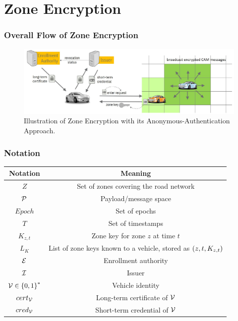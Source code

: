 \documentclass{beamer}
\begin{document}
    \section{Zone Encryption}
    \begin{frame}
        \frametitle{Overall Flow of Zone Encryption}
        \begin{figure}[!ht]
            \centering
            \includegraphics[width=\textwidth]{figs/ze_flow.png}
            \caption{Illustration of Zone Encryption with its Anonymous-Authentication Approach.}
        \end{figure}
    \end{frame}

    \begin{frame}
        \frametitle{Notation}
        \begin{table}[!ht]
            \centering
            \begin{tabular}{|c|c|}
                \hline
                \textbf{Notation} & \textbf{Meaning} \\
                \hline
                \(Z\) & Set of zones covering the road network \\
                \hline
                \(\mathcal P\) & Payload/message space \\
                \hline
                \(Epoch\) & Set of epochs \\
                \hline
                \(T\) & Set of timestamps \\
                \hline
                \(K_{z,t}\) & Zone key for zone \(z\) at time \(t\) \\
                \hline
                \(L_K\) & List of zone keys known to a vehicle, stored as
                \(\left(z,t,K_{z,t}\right)\) \\
                \hline
                \(\mathcal E\) & Enrollment authority \\
                \hline
                \(\mathcal I\) & Issuer \\
                \hline
                \(\mathcal V \in \left\{0,1\right\}^*\) & Vehicle identity \\
                \hline
                \(cert_{\mathcal V}\) & Long-term certificate of \(\mathcal V\) \\
                \hline
                \(cred_{\mathcal V}\) & Short-term credential of \(\mathcal V\) \\
                \hline
            \end{tabular}
        \end{table}
    \end{frame}
\end{document}
